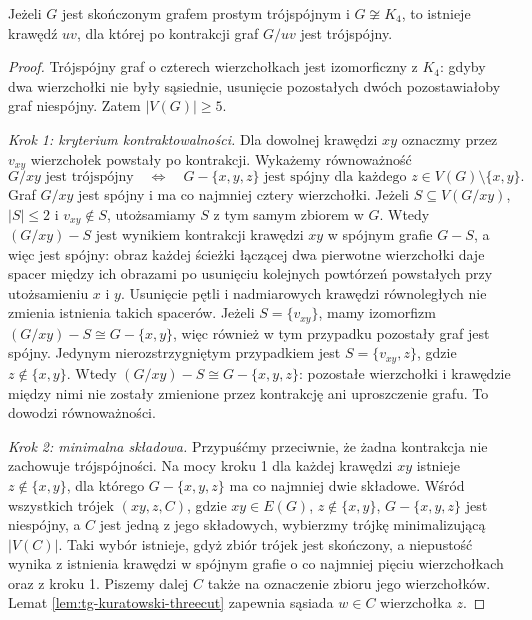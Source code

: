 \begin{lemat}
\label{lem:tg-kuratowski-contractible-edge}
Jeżeli $G$ jest skończonym
grafem prostym trójspójnym
i $G\not\cong K_4$,
to istnieje krawędź $uv$,
dla której po kontrakcji
graf $G/uv$ jest trójspójny.
\end{lemat}
\begin{proof}
Trójspójny graf o czterech wierzchołkach jest
izomorficzny z $K_4$: gdyby dwa wierzchołki nie
były sąsiednie, usunięcie pozostałych dwóch
pozostawiałoby graf niespójny. Zatem $|V(G)|\geq5$.

\emph{Krok 1: kryterium kontraktowalności.}
Dla dowolnej krawędzi $xy$ oznaczmy przez $v_{xy}$
wierzchołek powstały po kontrakcji. Wykażemy równoważność
\[
G/xy\text{ jest trójspójny}
\quad\Longleftrightarrow\quad
G-\{x,y,z\}\text{ jest spójny dla każdego }
z\in V(G)\setminus\{x,y\}.
\]
Graf $G/xy$ jest spójny i ma co najmniej cztery
wierzchołki. Jeżeli $S\subseteq V(G/xy)$,
$|S|\leq2$ i $v_{xy}\notin S$, utożsamiamy $S$
z tym samym zbiorem w $G$. Wtedy $(G/xy)-S$
jest wynikiem kontrakcji krawędzi $xy$ w spójnym
grafie $G-S$, a więc jest spójny: obraz każdej
ścieżki łączącej dwa pierwotne wierzchołki daje
spacer między ich obrazami po usunięciu kolejnych
powtórzeń powstałych przy utożsamieniu $x$ i $y$.
Usunięcie pętli i nadmiarowych krawędzi równoległych
nie zmienia istnienia takich spacerów.
Jeżeli $S=\{v_{xy}\}$, mamy izomorfizm
$(G/xy)-S\cong G-\{x,y\}$, więc również w tym
przypadku pozostały graf jest spójny.
Jedynym nierozstrzygniętym przypadkiem jest
$S=\{v_{xy},z\}$, gdzie $z\notin\{x,y\}$.
Wtedy $(G/xy)-S\cong G-\{x,y,z\}$: pozostałe
wierzchołki i krawędzie między nimi nie zostały
zmienione przez kontrakcję ani uproszczenie grafu.
To dowodzi równoważności.

\emph{Krok 2: minimalna składowa.}
Przypuśćmy przeciwnie, że żadna kontrakcja
nie zachowuje trójspójności. Na mocy kroku 1
dla każdej krawędzi $xy$ istnieje $z\notin\{x,y\}$,
dla którego $G-\{x,y,z\}$ ma co najmniej dwie
składowe. Wśród wszystkich trójek $(xy,z,C)$,
gdzie $xy\in E(G)$, $z\notin\{x,y\}$,
$G-\{x,y,z\}$ jest niespójny, a $C$ jest jedną
z jego składowych, wybierzmy trójkę minimalizującą
$|V(C)|$. Taki wybór istnieje, gdyż zbiór trójek
jest skończony, a niepustość wynika z istnienia
krawędzi w spójnym grafie o co najmniej pięciu
wierzchołkach oraz z kroku 1.
Piszemy dalej $C$ także na oznaczenie zbioru jego
wierzchołków. Lemat
\ref{lem:tg-kuratowski-threecut} zapewnia sąsiada
$w\in C$ wierzchołka $z$.


\end{proof}
